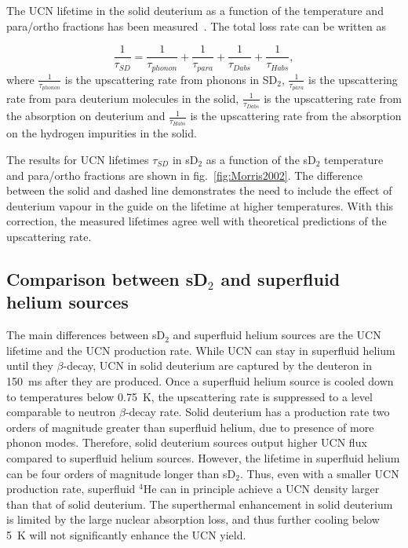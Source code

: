 The UCN lifetime in the solid deuterium as a function of the temperature
and para/ortho fractions has been measured~\cite{Morris2002}. The
total loss rate can be written as

\begin{equation}
\label{eqn:SD_lifetime}
\frac{1}{\tau_{SD}}=\frac{1}{\tau_{phonon}}+\frac{1}{\tau_{para}}+\frac{1}{\tau_{Dabs}}+ \frac{1}{\tau_{Habs}},
\end{equation}
where $\frac{1}{\tau_{phonon}}$ is the upscattering rate from phonons
in SD$_2$, $\frac{1}{\tau_{para}}$ is the upscattering rate from para
deuterium molecules in the solid, $\frac{1}{\tau_{Dabs}}$ is the
upscattering rate from the absorption on deuterium and
$\frac{1}{\tau_{Habs}}$ is the upscattering rate from the absorption
on the hydrogen impurities in the solid.



The results for UCN lifetimes
$\tau_{SD}$ in sD$_2$ as a function of the sD$_2$ temperature and
para/ortho fractions are shown in fig.~\ref{fig:Morris2002}. The
difference between the solid and dashed line demonstrates the need to
include the effect of deuterium vapour in the guide on the lifetime at
higher temperatures. With this correction, the measured lifetimes
agree well with theoretical predictions of the upscattering rate.


\subsection{Comparison between sD$_2$ and superfluid helium sources}

The main differences between sD$_2$ and superfluid helium sources are
the UCN lifetime and the UCN production rate. While UCN can stay in
superfluid helium until they $\beta$-decay, UCN in solid deuterium are
captured by the deuteron in 150~ms after they are produced.  Once a
superfluid helium source is cooled down to temperatures below 0.75~K,
the upscattering rate is suppressed to a level comparable to neutron
$\beta$-decay rate. Solid deuterium has a production rate two orders
of magnitude greater than superfluid helium, due to presence of more
phonon modes. Therefore, solid deuterium sources output higher UCN
flux compared to superfluid helium sources. However, the lifetime in
superfluid helium can be four orders of magnitude longer than
sD$_2$. Thus, even with a smaller UCN production rate, superfluid
$^4$He can in principle achieve a UCN density larger than that of
solid deuterium.  The superthermal enhancement in solid deuterium is
limited by the large nuclear absorption loss, and thus further cooling
below 5~K will not significantly enhance the UCN yield.

